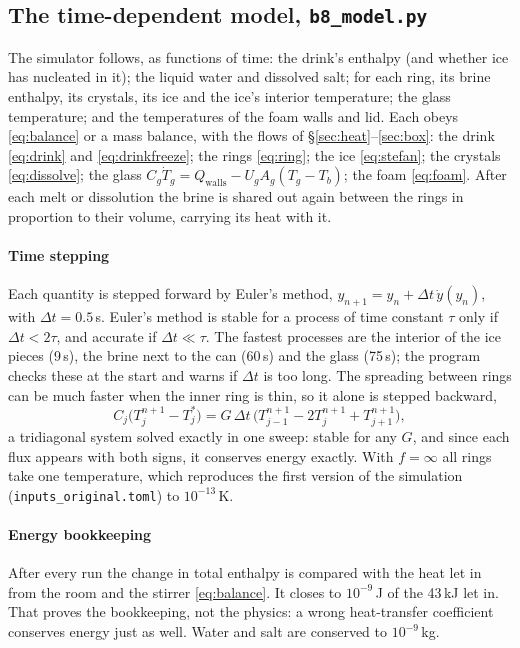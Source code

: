\documentclass[11pt,a4paper]{article}
\newcommand{\code}[1]{\texttt{#1}}
\begin{document}
\subsection{The time-dependent model, \code{b8\_model.py}}
The simulator follows, as functions of time: the drink's enthalpy (and whether ice has nucleated in
it); the liquid water and dissolved salt; for each ring, its brine enthalpy, its crystals, its ice and the
ice's interior temperature; the glass temperature; and the temperatures of the foam walls and lid. Each
obeys \eqref{eq:balance} or a mass balance, with the flows of §\ref{sec:heat}–\ref{sec:box}: the drink
\eqref{eq:drink} and \eqref{eq:drinkfreeze}; the rings \eqref{eq:ring}; the ice \eqref{eq:stefan}; the
crystals \eqref{eq:dissolve}; the glass $C_g\dot T_g = Q_{\text{walls}} - U_gA_g(T_g - T_b)$; the foam
\eqref{eq:foam}. After each melt or dissolution the brine is shared out again between the rings in
proportion to their volume, carrying its heat with it.

\paragraph{Time stepping} Each quantity is stepped forward by Euler's method,
$y_{n+1} = y_n + \Delta t\,\dot y(y_n)$, with $\Delta t = 0.5$\,s. Euler's method is stable for a process
of time constant $\tau$ only if $\Delta t < 2\tau$, and accurate if $\Delta t \ll \tau$. The fastest
processes are the interior of the ice pieces (9\,s), the brine next to the can (60\,s) and the glass
(75\,s); the program checks these at the start and warns if $\Delta t$ is too long. The spreading
between rings can be much faster when the inner ring is thin, so it alone is stepped backward,
\[
C_j\big(T_j^{n+1} - T_j^{*}\big) = G\,\Delta t\,\big(T_{j-1}^{n+1} - 2T_j^{n+1} + T_{j+1}^{n+1}\big),
\]
a tridiagonal system solved exactly in one sweep: stable for any $G$, and since each flux appears with
both signs, it conserves energy exactly. With $f = \infty$ all rings take one temperature, which
reproduces the first version of the simulation (\code{inputs\_original.toml}) to $10^{-13}$\,K.

\paragraph{Energy bookkeeping} After every run the change in total enthalpy is compared with the heat
let in from the room and the stirrer \eqref{eq:balance}. It closes to $10^{-9}$\,J of the 43\,kJ let in.
That proves the bookkeeping, not the physics: a wrong heat-transfer coefficient conserves energy just
as well. Water and salt are conserved to $10^{-9}$\,kg.
\end{document}
